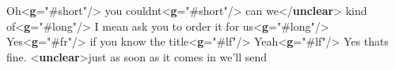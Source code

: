 \begin{shaded}
\hspace*{1em} Oh{<\textbf{g}\hspace*{1em}{ref}="{\#short}"/>}\mbox{}\newline 
\hspace*{1em}you couldnt{<\textbf{g}\hspace*{1em}{ref}="{\#short}"/>} can we{</\textbf{unclear}>} kind of{<\textbf{g}\hspace*{1em}{ref}="{\#long}"/>}\mbox{}\newline 
\hspace*{1em}I mean ask you to order it for us{<\textbf{g}\hspace*{1em}{ref}="{\#long}"/>}\mbox{}\newline 
\hspace*{1em}\mbox{}\newline 
{}\mbox{}\newline 
{} Yes{<\textbf{g}\hspace*{1em}{ref}="{\#fr}"/>} if you know the title{<\textbf{g}\hspace*{1em}{ref}="{\#lf}"/>} Yeah{<\textbf{g}\hspace*{1em}{ref}="{\#lf}"/>}\mbox{}\newline 
{}\mbox{}\newline 
{}\mbox{}\newline 
\hspace*{1em}\mbox{}\newline 
{}\mbox{}\newline 
{} Yes thats fine. {<\textbf{unclear}>}just as soon as it comes in we'll send\mbox{}\newline 

\end{shaded}
